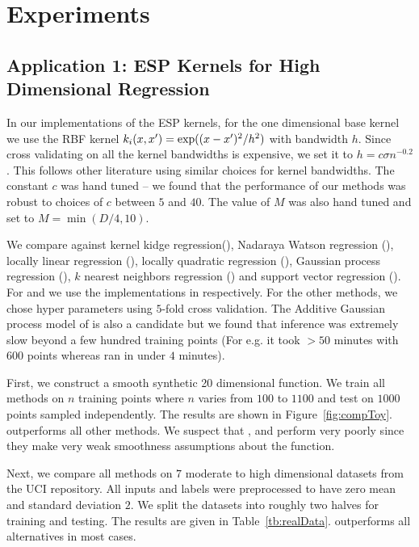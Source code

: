 \section{Experiments}
\label{sec:experiments}


\subsection{Application 1: ESP Kernels for High Dimensional Regression}
\insertTableRealData

In our implementations of the ESP kernels, for the one dimensional base kernel we use
the RBF kernel $k_i(x,x') = \exp((x-x')^2/h^2)$ with bandwidth $h$.
Since cross validating on all the kernel bandwidths is expensive, we set
it to $h = c\sigma n^{-0.2}$. This follows other literature 
\cite{gyorfi02distributionfree,tsybakov08nonparametric,ravikumar09spam} 
using similar choices for kernel
bandwidths. The constant $c$ was hand tuned -- we found that the performance of
our methods was robust to choices of $c$ between $5$ and $40$.
The value of $M$ was also hand tuned and set to $M = \min(D/4, 10)$.

We compare \addkrrs against kernel kidge regression(\krr),
Nadaraya Watson regression (\nw), locally linear regression (\locallin), locally
quadratic regression (\localquad), Gaussian process regression (\gp), $k$
nearest neighbors regression (\knn) and support vector regression (\svr).
For \gps and \svrs we use the implementations in
\citet{rasmussen10gpml,chang11libsvm} respectively.
For the other methods, we chose hyper parameters using $5$-fold cross
validation.
The Additive Gaussian process model of \citet{duvenaud11additivegps} is also a
candidate but we found that inference was extremely slow beyond a few hundred
training points (For e.g. it took $> 50$ minutes with $600$ points whereas
\addkrrs ran in under $4$ minutes).

\insertFigOpt
\insertFigRegFSel

First, we construct a smooth synthetic 20 dimensional function. We train all methods on
$n$ training points where $n$ varies from $100$ to $1100$ and test on $1000$
points sampled independently. The results are shown in Figure~\ref{fig:compToy}.
\addkrrs outperforms all other methods. We suspect that \nw, \locallins and \knns perform
very poorly since they make very weak smoothness assumptions about the function.

Next, we compare all methods on $7$ moderate to high dimensional datasets from the UCI
repository. All inputs and labels were preprocessed to have zero mean and 
standard deviation $2$. We split the datasets into roughly two halves for training
and testing. The results are given in Table~\ref{tb:realData}. 
\addkrrs  outperforms all alternatives in most cases.




